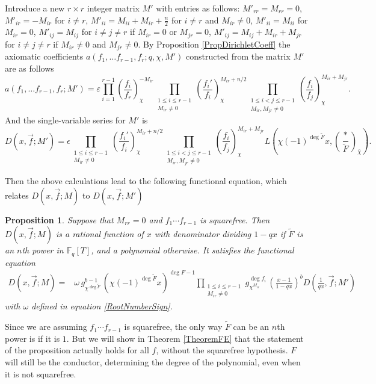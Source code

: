 \documentclass[11pt,letterpaper]{article}
\newtheorem{prop}[theorem]{Proposition}
\theoremstyle{definition}
\theoremstyle{remark}
\numberwithin{equation}{section}
\theoremstyle{dotless}
\newcommand{\F}{\mathbb{F}}
\newcommand{\res}[2]{\left(\frac{#1}{#2}\right)}
\renewcommand{\tilde}{\widetilde}
\begin{document}
Introduce a new $r\times r$ integer matrix $M'$ with entries as follows: $M'_{rr}=M_{rr}=0$, $M'_{ir}=-M_{ir}$ for $i\neq r$, $M'_{ii}=M_{ii}+M_{ir}+\frac{n}{2}$ for $i \neq r$ and $M_{ir} \neq 0$, $M'_{ii}=M_{ii}$ for $M_{ir} = 0$, $M'_{ij}=M_{ij}$ for $i\neq j \neq r$ if $M_{ir}=0$ or $M_{jr}=0$, $M'_{ij}=M_{ij}+M_{ir}+M_{jr}$ for $i\neq j \neq r$ if $M_{ir}\neq0$ and $M_{jr}\neq 0$. By Proposition \ref{PropDirichletCoeff} the axiomatic coefficients $a(f_1, \ldots f_{r-1}, f_r; q, \chi, M')$ constructed from the matrix $M'$ are as follows
\begin{equation*}
a(f_1, \ldots f_{r-1}, f_r; M')= \varepsilon \prod_{i=1}^{r-1} \res{f_i}{f_r}_{\chi}^{-M_{ir}} \prod_{\substack{1 \leq i \leq r-1 \\ M_{ir} \neq 0}} \res{f_i'}{f_i}_{\chi}^{M_{ir}+n/2}
\prod_{\substack{1 \leq i<j \leq r-1 \\ M_{ir}, M_{jr} \neq 0}} \res{f_i}{f_j}_{\chi}^{M_{ir}+M_{jr}}.
\end{equation*}
And the single-variable series for $M'$ is 
\begin{equation*}
D(x, \vec{f}; M')= \epsilon \prod_{\substack{1 \leq i \leq r-1 \\ M_{ir} \neq 0}} \res{f_i'}{f_i}_{\chi}^{M_{ir}+n/2}
\prod_{\substack{1 \leq i<j \leq r-1 \\ M_{ir}, M_{jr} \neq 0}} \res{f_i}{f_j}_{\chi}^{M_{ir}+M_{jr}} L \left(\chi(-1)^{\deg \tilde{F}} x, \res{*}{\tilde{F}}_{\bar{\chi}}\right) .
\end{equation*}

Then the above calculations lead to the following functional equation, which relates $D(x, \vec{f}; M)$ to $D(x, \vec{f}; M')$
\begin{prop} \label{PropDirichletFE}
Suppose that $M_{rr}=0$ and $f_1 \cdots f_{r-1}$ is squarefree. Then $D(x, \vec{f}; M)$ is a rational function of $x$ with denominator dividing $1-qx$ if $\tilde{F}$ is an $n$th power in $\F_q[T]$, and a polynomial otherwise. It satisfies the functional equation 
\begin{equation} \label{DirichletFE}
\begin{split}
D(x, \vec{f}; M) =& \omega \, g_{\chi^{\deg \tilde{F}}}^{b-1} \, (\chi(-1)^{\deg \tilde{F}} x)^{\deg F-1} \prod_{\substack{1 \leq i \leq r-1 \\ M_{ir} \neq 0}} g_{\chi^{M_{ir}}}^{\deg f_i} \, \left(\frac{x-1}{1-qx}\right)^b D\left(\frac{1}{qx}, \vec{f}; M'\right)
\end{split}
\end{equation}
with $\omega$ defined in equation \eqref{RootNumberSign}.
\end{prop}
\noindent Since we are assuming $f_1 \cdots f_{r-1}$ is squarefree, the only way $\tilde{F}$ can be an $n$th power is if it is $1$. But we will show in Theorem \ref{TheoremFE} that the statement of the proposition actually holds for all $f$, without the squarefree hypothesis. $F$ will still be the conductor, determining the degree of the polynomial, even when it is not squarefree. 
\end{document}

